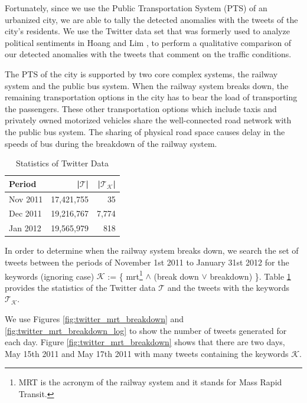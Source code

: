 \documentclass[draft]{sig-alternate}
\begin{document}
Fortunately, since we use the Public Transportation System (PTS) of an urbanized city, we are able to tally the detected anomalies with the tweets of the city's residents. We use the Twitter data set that was formerly used to analyze political sentiments in Hoang and Lim \cite{Hoang2012}, to perform a qualitative comparison of our detected anomalies with the tweets that comment on the traffic conditions. %

The PTS of the city is supported by two core complex systems, the railway system and the public bus system. When the railway system breaks down, the remaining transportation options in the city has to bear the load of transporting the passengers. These other transportation options which include taxis and privately owned motorized vehicles share the well-connected road network with the public bus system. The sharing of physical road space causes delay in the speeds of bus during the breakdown of the railway system. 

\begin{table}[htb]
	\centering
	\caption{Statistics of Twitter Data}
	\label{tbl:twitter}
	\begin{tabular}{|l|r|r|}
		\hline
			Period & |$\mathcal{T}$|  & |$\mathcal{T}_{\mathcal{K}}$| \\
		\hline
			Nov 2011 & 17,421,755 & 35 \\
		\hline
			Dec 2011 & 19,216,767 & 7,774 \\
		\hline
			Jan 2012 &  19,565,979 & 818 \\
		\hline
	\end{tabular}	
\end{table}

In order to determine when the railway system breaks down, we search the set of tweets between the periods of November 1st 2011 to January 31st 2012 for the keywords (ignoring case) $\mathcal{K}$ := \{ mrt\footnote{MRT is the acronym of the railway system and it stands for Mass Rapid Transit.} $\land$ (break down $\lor$ breakdown) \}. Table \ref{tbl:twitter} provides the statistics of the Twitter data $\mathcal{T}$ and the tweets with the keywords $\mathcal{T}_{\mathcal{K}}$.

We use Figures \ref{fig:twitter_mrt_breakdown} and \ref{fig:twitter_mrt_breakdown_log} to show the number of tweets generated for each day. Figure \ref{fig:twitter_mrt_breakdown} shows that there are two days, May 15th 2011 and May 17th 2011 with many tweets containing the keywords $\mathcal{K}$.
\end{document}
